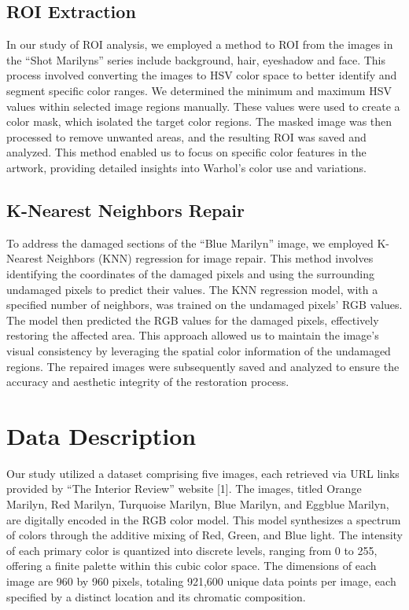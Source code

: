 \documentclass{article}
\begin{document}
\hypertarget{roi-extraction}{%
\subsection{ROI Extraction}\label{roi-extraction}}

In our study of ROI analysis, we employed a method to ROI from the
images in the ``Shot Marilyns'' series include background, hair,
eyeshadow and face. This process involved converting the images to HSV
color space to better identify and segment specific color ranges. We
determined the minimum and maximum HSV values within selected image
regions manually. These values were used to create a color mask, which
isolated the target color regions. The masked image was then processed
to remove unwanted areas, and the resulting ROI was saved and analyzed.
This method enabled us to focus on specific color features in the
artwork, providing detailed insights into Warhol's color use and
variations.

\hypertarget{k-nearest-neighbors-repair}{%
\subsection{K-Nearest Neighbors
Repair}\label{k-nearest-neighbors-repair}}

To address the damaged sections of the ``Blue Marilyn'' image, we
employed K-Nearest Neighbors (KNN) regression for image repair. This
method involves identifying the coordinates of the damaged pixels and
using the surrounding undamaged pixels to predict their values. The KNN
regression model, with a specified number of neighbors, was trained on
the undamaged pixels' RGB values. The model then predicted the RGB
values for the damaged pixels, effectively restoring the affected area.
This approach allowed us to maintain the image's visual consistency by
leveraging the spatial color information of the undamaged regions. The
repaired images were subsequently saved and analyzed to ensure the
accuracy and aesthetic integrity of the restoration process.

\hypertarget{data-description}{%
\section{Data Description}\label{data-description}}

Our study utilized a dataset comprising five images, each retrieved via
URL links provided by ``The Interior Review'' website {[}1{]}. The
images, titled Orange Marilyn, Red Marilyn, Turquoise Marilyn, Blue
Marilyn, and Eggblue Marilyn, are digitally encoded in the RGB color
model. This model synthesizes a spectrum of colors through the additive
mixing of Red, Green, and Blue light. The intensity of each primary
color is quantized into discrete levels, ranging from 0 to 255, offering
a finite palette within this cubic color space. The dimensions of each
image are 960 by 960 pixels, totaling 921,600 unique data points per
image, each specified by a distinct location and its chromatic
composition.
\end{document}
